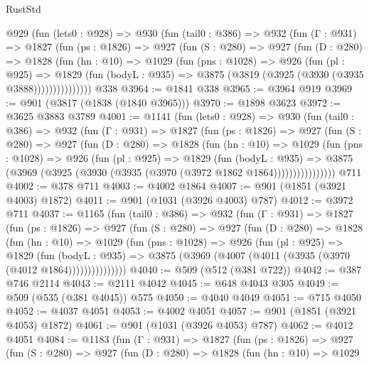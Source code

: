 \begin{lexlean}{RustStd}
\begin{coremodule}
    @929
      (fun (lets0 : @928) =>
      @930
        (fun (tail0 : @386) =>
        @932
          (fun (Γ : @931) =>
          @1827
            (fun (ps : @1826) =>
            @927
              (fun (S : @280) =>
              @927
                (fun (D : @280) =>
                @1828
                  (fun (hn : @10) =>
                  @1029
                    (fun (pns : @1028) =>
                    @926
                      (fun (pl : @925) =>
                      @1829
                        (fun (bodyL : @935) =>
                        @3875 (@3819 (@3925 (@3930 (@3935 @3888)))))))))))))))
    @338
@3964 := @1841 @338
@3965 := @3964 @919
@3969 := @901 (@3817 (@1838 (@1840 @3965)))
@3970 := @1898 @3623
@3972 := @3625 @3883 @3789
@4001 := @1141
    (fun (lets0 : @928) =>
    @930
      (fun (tail0 : @386) =>
      @932
        (fun (Γ : @931) =>
        @1827
          (fun (ps : @1826) =>
          @927
            (fun (S : @280) =>
            @927
              (fun (D : @280) =>
              @1828
                (fun (hn : @10) =>
                @1029
                  (fun (pns : @1028) =>
                  @926
                    (fun (pl : @925) =>
                    @1829
                      (fun (bodyL : @935) =>
                      @3875 (@3969 (@3925 (@3930 (@3935 (@3970 (@3972 @1862 @1864))))))))))))))))
    @711
@4002 := @378 @711
@4003 := @4002 @1864
@4007 := @901 (@1851 (@3921 @4003) @1872)
@4011 := @901 (@1031 (@3926 @4003) @787)
@4012 := @3972 @711
@4037 := @1165
    (fun (tail0 : @386) =>
    @932
      (fun (Γ : @931) =>
      @1827
        (fun (ps : @1826) =>
        @927
          (fun (S : @280) =>
          @927
            (fun (D : @280) =>
            @1828
              (fun (hn : @10) =>
              @1029
                (fun (pns : @1028) =>
                @926
                  (fun (pl : @925) =>
                  @1829
                    (fun (bodyL : @935) =>
                    @3875 (@3969 (@4007 (@4011 (@3935 (@3970 (@4012 @1864)))))))))))))))
@4040 := @509 (@512 (@381 @722))
@4042 := @387 @746 @2114
@4043 := @2111 @4042
@4045 := @648 @4043 @305
@4049 := @509 (@535 (@381 @4045)) @575
@4050 := @4040 @4049
@4051 := @715 @4050
@4052 := @4037 @4051
@4053 := @4002 @4051
@4057 := @901 (@1851 (@3921 @4053) @1872)
@4061 := @901 (@1031 (@3926 @4053) @787)
@4062 := @4012 @4051
@4084 := @1183
    (fun (Γ : @931) =>
    @1827
      (fun (ps : @1826) =>
      @927
        (fun (S : @280) =>
        @927
          (fun (D : @280) =>
          @1828
            (fun (hn : @10) =>
            @1029

\end{coremodule}
\end{lexlean}
